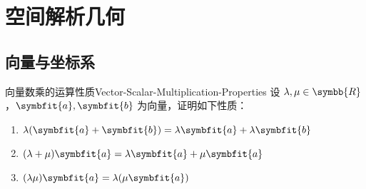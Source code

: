 \chapter{空间解析几何}

\section{向量与坐标系}

\begin{problem}{向量数乘的运算性质}{Vector-Scalar-Multiplication-Properties}
    设 $\lambda, \mu \in \symbb{R}$，$\symbfit{a}, \symbfit{b}$ 为向量，证明如下性质：
    \begin{enumerate}
        \item $\lambda(\symbfit{a} + \symbfit{b}) = \lambda\symbfit{a} + \lambda\symbfit{b}$
        \item $(\lambda + \mu)\symbfit{a} = \lambda\symbfit{a} + \mu\symbfit{a}$
        \item $(\lambda\mu)\symbfit{a} = \lambda(\mu\symbfit{a})$
    \end{enumerate}
\end{problem}

